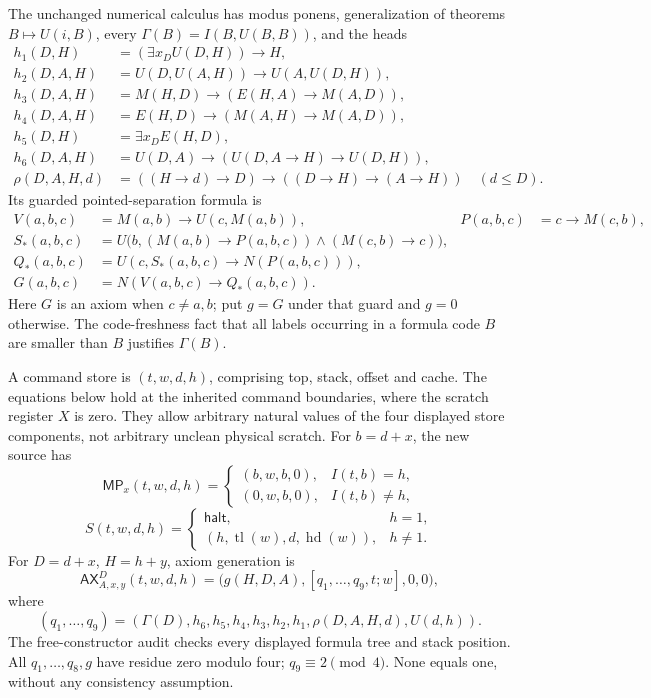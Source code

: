 The unchanged numerical calculus has modus ponens, generalization of
theorems $B\mapsto U(i,B)$, every $\Gamma(B)=I(B,U(B,B))$, and the heads
\begin{align*}
 h_1(D,H)&=(\exists x_D U(D,H))\to H,\\
 h_2(D,A,H)&=U(D,U(A,H))\to U(A,U(D,H)),\\
 h_3(D,A,H)&=M(H,D)\to(E(H,A)\to M(A,D)),\\
 h_4(D,A,H)&=E(H,D)\to(M(A,H)\to M(A,D)),\\
 h_5(D,H)&=\exists x_D E(H,D),\\
 h_6(D,A,H)&=U(D,A)\to(U(D,A\to H)\to U(D,H)),\\
 \rho(D,A,H,d)&=((H\to d)\to D)\to((D\to H)\to(A\to H))\quad(d\le D).
\end{align*}
Its guarded pointed-separation formula is
\begin{align*}
 V(a,b,c)&=M(a,b)\to U(c,M(a,b)),&P(a,b,c)&=c\to M(c,b),\\
 S_*(a,b,c)&=U\bigl(b,(M(a,b)\to P(a,b,c))\wedge(M(c,b)\to c)\bigr),\\
 Q_*(a,b,c)&=U(c,S_*(a,b,c)\to N(P(a,b,c))),\\
 G(a,b,c)&=N(V(a,b,c)\to Q_*(a,b,c)).
\end{align*}
Here $G$ is an axiom when $c\ne a,b$; put $g=G$ under that guard and
$g=0$ otherwise. The code-freshness fact that all labels occurring in a
formula code $B$ are smaller than $B$ justifies $\Gamma(B)$.

A command store is $(t,w,d,h)$, comprising top, stack, offset and cache.
The equations below hold at the inherited command boundaries, where the
scratch register $X$ is zero. They allow arbitrary natural values of the
four displayed store components, not arbitrary unclean physical scratch.
For $b=d+x$, the new source has
\[
 \mathsf{MP}_x(t,w,d,h)=
 \begin{cases}(b,w,b,0),&I(t,b)=h,\\(0,w,b,0),&I(t,b)\ne h,\end{cases}
\]
\[
 S(t,w,d,h)=
 \begin{cases}\mathsf{halt},&h=1,\\
 (h,\operatorname{tl}(w),d,\operatorname{hd}(w)),&h\ne1.\end{cases}
\]
For $D=d+x$, $H=h+y$, axiom generation is
\[
 \mathsf{AX}^{D}_{A,x,y}(t,w,d,h)
 =\bigl(g(H,D,A),[q_1,\ldots,q_9,t;w],0,0\bigr),
\]
where
\[
 (q_1,\ldots,q_9)=
 (\Gamma(D),h_6,h_5,h_4,h_3,h_2,h_1,\rho(D,A,H,d),U(d,h)).
\]
The free-constructor audit checks every displayed formula tree and stack
position. All $q_1,\ldots,q_8,g$ have residue zero modulo four;
$q_9\equiv2\pmod4$. None equals one, without any consistency assumption.

